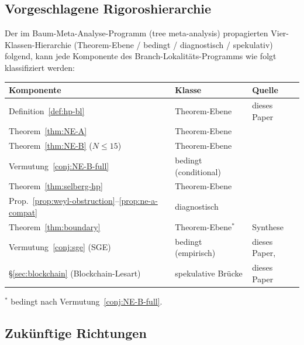 \documentclass[11pt]{article}
\theoremstyle{definition}
\theoremstyle{remark}
\begin{document}
\subsection{Vorgeschlagene Rigoroshierarchie}
\label{sec:rigor}

Der im Baum-Meta-Analyse-Programm (tree meta-analysis) propagierten Vier-Klassen-Hierarchie
(Theorem-Ebene / bedingt / diagnostisch / spekulativ) folgend, kann jede
Komponente des Branch-Lokalitäts-Programms wie folgt klassifiziert werden:

\begin{center}
\begin{tabular}{@{}lll@{}}
\toprule
Komponente & Klasse & Quelle \\
\midrule
Definition~\ref{def:hp-bl} & Theorem-Ebene & dieses Paper \\
Theorem~\ref{thm:NE-A} & Theorem-Ebene & \cite{Geiger2026RHII} \\
Theorem~\ref{thm:NE-B} ($N\leq 15$) & Theorem-Ebene & \cite{Geiger2026RHII} \\
Vermutung~\ref{conj:NE-B-full} & bedingt (conditional) & \cite{Geiger2026RHII} \\
Theorem~\ref{thm:selberg-hp} & Theorem-Ebene & \cite{Selberg1956} \\
Prop.~\ref{prop:weyl-obstruction}--\ref{prop:ne-a-compat} & diagnostisch & \cite{Geiger2026RHIII} \\
Theorem~\ref{thm:boundary} & Theorem-Ebene${}^*$ & Synthese \\
Vermutung~\ref{conj:sge} (SGE) & bedingt (empirisch) & dieses Paper, \cite{SGENote} \\
\S\ref{sec:blockchain} (Blockchain-Lesart) & spekulative Brücke & dieses Paper \\
\bottomrule
\end{tabular}
\end{center}
${}^*$ bedingt nach Vermutung~\ref{conj:NE-B-full}.

\subsection{Zukünftige Richtungen}
\end{document}
